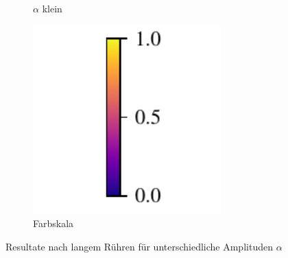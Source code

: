 \begin{frame}{}
\begin{figure}
\begin{subfigure}{0.32\textwidth}
\caption{$\alpha$ klein}
\end{subfigure}
%
\begin{subfigure}{0.32\textwidth}
\centering
\includegraphics[width=0.8\textwidth]{images/colorbar}
\caption{Farbskala}
\end{subfigure}
\caption{Resultate nach langem Rühren für unterschiedliche Amplituden $\alpha$}
\end{figure}
\end{frame}


